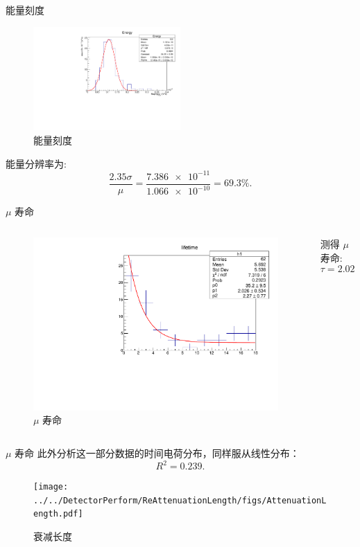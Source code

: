 \documentclass[10pt]{beamer}
\begin{document}
\begin{frame}[label={sec:org732602a}]{能量刻度}
\begin{figure}[htbp]
\centering
\includegraphics[width=0.5\textwidth]{../../DetectorPerform/ECali/qqdist.pdf}
\caption{能量刻度}
\end{figure}

能量分辨率为:
\begin{equation}
\label{eq:4}
\frac{2.35\sigma}{\mu} = \frac{\num{7.386e-11}}{\num{1.066e-10}} = 69.3\%.
\end{equation}
\end{frame}


\begin{frame}[label={sec:org6b888d2}]{\(\mu\) 寿命}
\begin{columns}
\begin{column}{0.5\columnwidth}
\begin{figure}[htbp]
\centering
\includegraphics[width=1.0\textwidth]{../../img/lifeTimeHist.pdf}
\caption{\(\mu\) 寿命}
\end{figure}
\end{column}

\begin{column}{0.5\columnwidth}
测得 \(\mu\) 寿命:  
\begin{equation}
\label{eq:5}
\tau = 2.026 \pm \qty{0.534}{\mu s}.
\end{equation}
\end{column}
\end{columns}
\end{frame}

\begin{frame}[label={sec:org8795592}]{\(\mu\) 寿命}
    此外分析这一部分数据的时间电荷分布，同样服从线性分布：
    $$R^2=0.239.$$
    \begin{figure}[htbp]
    \centering
    \texttt{[image: ../../DetectorPerform/ReAttenuationLength/figs/AttenuationLength.pdf]}
    \caption{衰减长度}
    \end{figure}
    \end{frame}
\end{document}
